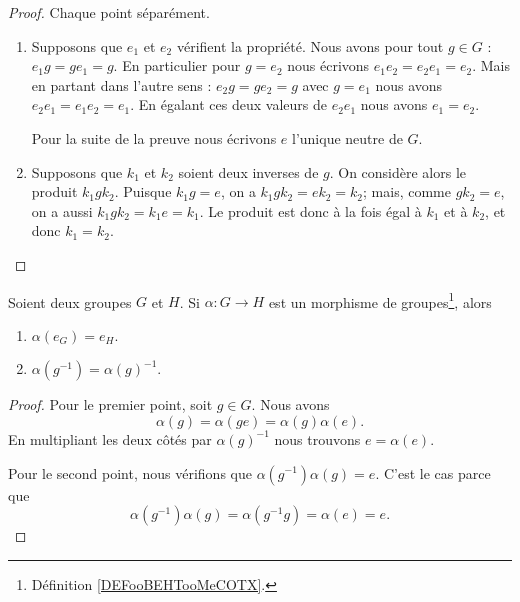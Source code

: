 \begin{proof}
	Chaque point séparément.
	\begin{enumerate}
		\item
		      Supposons que \( e_1\) et \( e_2\) vérifient la propriété. Nous avons pour tout \( g\in G\) : \( e_1g=ge_1=g\). En particulier pour \( g=e_2\) nous écrivons \( e_1e_2=e_2e_1=e_2\). Mais en partant dans l'autre sens : \( e_2g=ge_2=g\) avec \( g=e_1\) nous avons \( e_2e_1=e_1e_2=e_1\). En égalant ces deux valeurs de \( e_2e_1\) nous avons \( e_1=e_2\).

		      Pour la suite de la preuve nous écrivons \( e\) l'unique neutre de \( G\).

		\item
		      Supposons que \( k_1\) et \( k_2\) soient deux inverses de \( g\). On considère alors le produit \( k_1 g k_2 \). Puisque \(k_1 g = e \), on a \( k_1 g k_2 = e k_2 = k_2 \); mais, comme \(g k_2 = e \), on a aussi \( k_1 g k_2 = k_1 e = k_1 \). Le produit est donc à la fois égal à \( k_1 \) et à \( k_2 \), et donc \( k_1 = k_2 \).
	\end{enumerate}
\end{proof}

\begin{lemma}       \label{LEMooWYLRooNOdZnp}
	Soient deux groupes \( G\) et \( H\). Si \( \alpha\colon G\to H\) est un morphisme de groupes\footnote{Définition \ref{DEFooBEHTooMeCOTX}.}, alors
	\begin{enumerate}
		\item
		      \( \alpha(e_G)=e_H\).
		\item
		      \( \alpha(g^{-1})=\alpha(g)^{-1}\).
	\end{enumerate}
\end{lemma}

\begin{proof}
	Pour le premier point, soit \( g\in G\). Nous avons
	\begin{equation}
		\alpha(g)=\alpha(ge)=\alpha(g)\alpha(e).
	\end{equation}
	En multipliant les deux côtés par \( \alpha(g)^{-1}\) nous trouvons \( e=\alpha(e)\).

	Pour le second point, nous vérifions que \( \alpha(g^{-1})\alpha(g)=e\). C'est le cas parce que
	\begin{equation}
		\alpha(g^{-1})\alpha(g)=\alpha(g^{-1}g)=\alpha(e)=e.
	\end{equation}
\end{proof}

